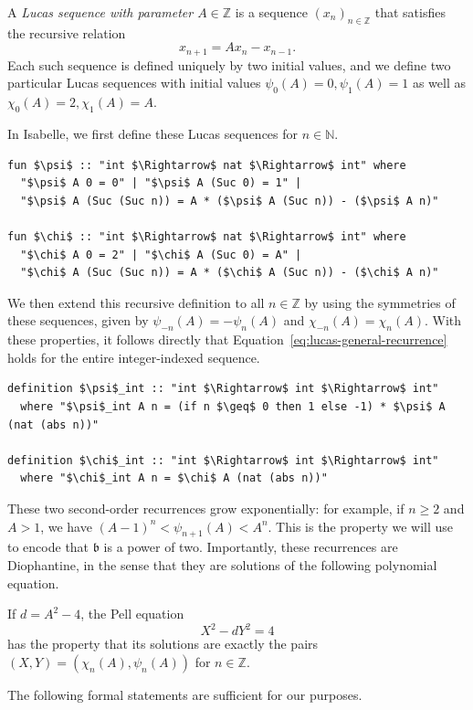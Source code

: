 \documentclass[a4paper,USenglish,cleveref,autoref,thm-restate]{lipics-v2021}
\newcommand{\N}{{\mathbb N}}
\newcommand{\Z}{{\mathbb Z}}
\newcommand{\bLowercase}{\mathfrak{b}}
\begin{document}
\begin{definition}
A \emph{Lucas sequence with parameter $A\in\Z$} is a sequence $(x_n)_{n\in \Z}$ that satisfies the recursive relation 
\begin{equation}\label{eq:lucas-general-recurrence}
    x_{n+1}=Ax_n-x_{n-1}.
\end{equation}
Each such sequence is defined uniquely by two initial values, and we define two particular Lucas sequences with initial values $\psi_0(A)=0, \psi_1(A)=1$ as well as $\chi_0(A)=2, \chi_1(A)=A$.
\end{definition}
In Isabelle, we first define these Lucas sequences for $n \in \N$.
\begin{lstlisting}
fun $\psi$ :: "int $\Rightarrow$ nat $\Rightarrow$ int" where
  "$\psi$ A 0 = 0" | "$\psi$ A (Suc 0) = 1" |
  "$\psi$ A (Suc (Suc n)) = A * ($\psi$ A (Suc n)) - ($\psi$ A n)"

fun $\chi$ :: "int $\Rightarrow$ nat $\Rightarrow$ int" where
  "$\chi$ A 0 = 2" | "$\chi$ A (Suc 0) = A" |
  "$\chi$ A (Suc (Suc n)) = A * ($\chi$ A (Suc n)) - ($\chi$ A n)"
\end{lstlisting}
We then extend this recursive definition to all $n \in \Z$ by using the symmetries of these sequences, given by $\psi_{-n}(A) = -\psi_n(A)$ and $\chi_{-n}(A) = \chi_n(A)$. With these properties, it follows directly that Equation~\eqref{eq:lucas-general-recurrence} holds for the entire integer-indexed sequence.

\begin{lstlisting}
definition $\psi$_int :: "int $\Rightarrow$ int $\Rightarrow$ int"
  where "$\psi$_int A n = (if n $\geq$ 0 then 1 else -1) * $\psi$ A (nat (abs n))"

definition $\chi$_int :: "int $\Rightarrow$ int $\Rightarrow$ int"
  where "$\chi$_int A n = $\chi$ A (nat (abs n))"
\end{lstlisting}

These two second-order recurrences grow exponentially: for example, if $n \ge 2$ and $A>1$, we have $(A-1)^n < \psi_{n+1}(A) < A^n$. This is the property we will use to encode that $\bLowercase$ is a power of two. Importantly, these recurrences are Diophantine, in the sense that they are solutions of the following polynomial equation.

\begin{lemma}
\label{lem:PellEquation}
If $d=A^2-4$, the Pell equation
\begin{equation}
    X^2-dY^2=4
\end{equation}
has the property that its solutions are exactly the pairs $(X,Y)=(\chi_n(A),\psi_n(A))$ for $n\in\Z$.
\end{lemma}
The following formal statements are sufficient for our purposes. 
\end{document}
